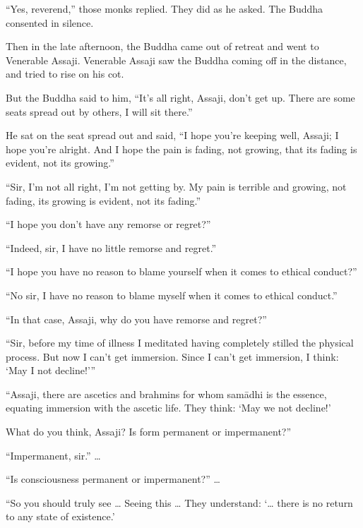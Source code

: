 \documentclass[12pt,openany]{book}%
\begin{document}
“Yes, reverend,” those monks replied. They did as he asked. The Buddha consented in silence. 

Then in the late afternoon, the Buddha came out of retreat and went to Venerable Assaji. Venerable Assaji saw the Buddha coming off in the distance, and tried to rise on his cot. 

But the Buddha said to him, “It’s all right, Assaji, don’t get up. There are some seats spread out by others, I will sit there.” 

He sat on the seat spread out and said, “I hope you’re keeping well, Assaji; I hope you’re alright. And I hope the pain is fading, not growing, that its fading is evident, not its growing.” 

“Sir, I’m not all right, I’m not getting by. My pain is terrible and growing, not fading, its growing is evident, not its fading.” 

“I hope you don’t have any remorse or regret?” 

“Indeed, sir, I have no little remorse and regret.” 

“I hope you have no reason to blame yourself when it comes to ethical conduct?” 

“No sir, I have no reason to blame myself when it comes to ethical conduct.” 

“In that case, Assaji, why do you have remorse and regret?” 

“Sir, before my time of illness I meditated having completely stilled the physical process. But now I can’t get immersion. Since I can’t get immersion, I think: ‘May I not decline!’” 

“Assaji, there are ascetics and brahmins for whom \textsanskrit{samādhi} is the essence, equating immersion with the ascetic life. They think: ‘May we not decline!’ 

What do you think, Assaji? Is form permanent or impermanent?” 

“Impermanent, sir.” … 

“Is consciousness permanent or impermanent?” … 

“So you should truly see … Seeing this … They understand: ‘… there is no return to any state of existence.’ 
\end{document}
